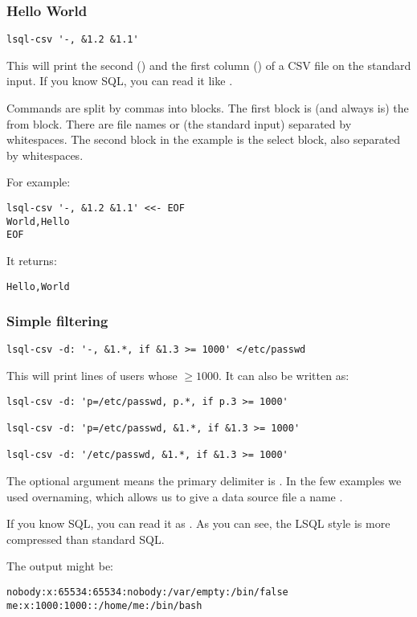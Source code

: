 \subsubsection{Hello World}
\begin{verbatim}
lsql-csv '-, &1.2 &1.1'
\end{verbatim}
This will print the second () and the first column () of a CSV file on the standard input. If you know SQL, you can read it like .

Commands are split by commas into blocks. The first block is (and always is) the from block. There are file names or \icode{-} (the standard input) separated by whitespaces. The second block in the example is the select block, also separated by whitespaces.

For example:
\begin{verbatim}
lsql-csv '-, &1.2 &1.1' <<- EOF
World,Hello
EOF
\end{verbatim}
It returns:
\begin{verbatim}
Hello,World
\end{verbatim}


\subsubsection{Simple filtering}

\begin{verbatim}
lsql-csv -d: '-, &1.*, if &1.3 >= 1000' </etc/passwd
\end{verbatim}
This will print lines of users whose  $\geq 1000$. It can also be written as:
\begin{verbatim}
lsql-csv -d: 'p=/etc/passwd, p.*, if p.3 >= 1000'
    
lsql-csv -d: 'p=/etc/passwd, &1.*, if &1.3 >= 1000'

lsql-csv -d: '/etc/passwd, &1.*, if &1.3 >= 1000'
\end{verbatim}
The  optional argument means the primary delimiter is \icode{:}. In the few examples we used overnaming, which allows us to give a data source file  a name .

If you know SQL, you can read it as . As you can see, the LSQL style is more compressed than standard SQL.

The output might be:
\begin{verbatim}
nobody:x:65534:65534:nobody:/var/empty:/bin/false
me:x:1000:1000::/home/me:/bin/bash
\end{verbatim}

